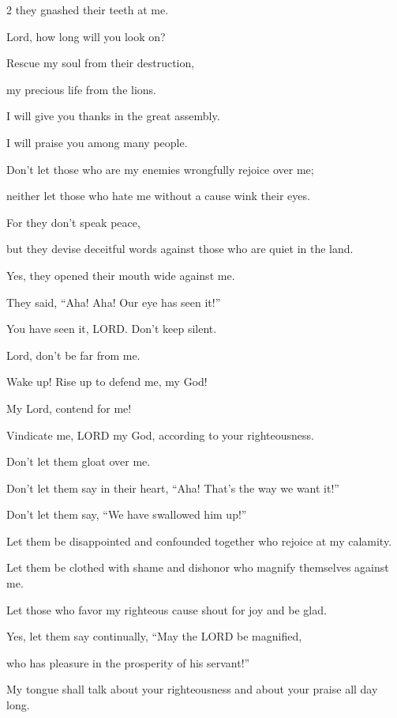 \begin{multicols}{2}
	they gnashed their teeth at me.
	
	
	\myverse{}Lord, how long will you look on?
	
	Rescue my soul from their destruction,
	
	my precious life from the lions.
	
	
	\myverse{}I will give you thanks in the great assembly.
	
	I will praise you among many people.
	
	
	\myverse{}Don’t let those who are my enemies wrongfully rejoice over
	me;
	
	neither let those who hate me without a cause wink their eyes.
	
	
	\myverse{}For they don’t speak peace,
	
	but they devise deceitful words against those who are quiet in the land.
	
	
	\myverse{}Yes, they opened their mouth wide against me.
	
	They said, “Aha! Aha! Our eye has seen it!”
	
	
	\myverse{}You have seen it, LORD. Don’t keep silent.
	
	Lord, don’t be far from me.
	
	
	\myverse{}Wake up! Rise up to defend me, my God!
	
	My Lord, contend for me!
	
	
	\myverse{}Vindicate me, LORD my God, according to your righteousness.
	
	Don’t let them gloat over me.
	
	
	\myverse{}Don’t let them say in their heart, “Aha! That’s the way we
	want it!”
	
	Don’t let them say, “We have swallowed him up!”
	
	
	\myverse{}Let them be disappointed and confounded together who rejoice
	at my calamity.
	
	Let them be clothed with shame and dishonor who magnify themselves against me.
	
	\vspace{\baselineskip}
	
	\myverse{}Let those who favor my righteous cause shout for joy and be
	glad.
	
	Yes, let them say continually, “May the LORD be magnified,
	
	who has pleasure in the prosperity of his servant!”
	
	
	\myverse{}My tongue shall talk about your righteousness and about your
	praise all day long.
	

\end{multicols}
